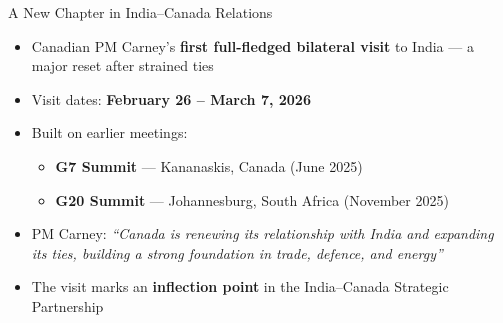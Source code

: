 \documentclass{beamer}
\begin{document}
\begin{frame}{A New Chapter in India--Canada Relations}
  \begin{itemize}
    \item Canadian PM Carney's \textbf{first full-fledged bilateral visit} to India --- a major reset after strained ties
    \item Visit dates: \textbf{February 26 -- March 7, 2026}
    \item Built on earlier meetings:
      \begin{itemize}
        \item \textbf{G7 Summit} --- Kananaskis, Canada (June 2025)
        \item \textbf{G20 Summit} --- Johannesburg, South Africa (November 2025)
      \end{itemize}
    \item PM Carney: \textit{``Canada is renewing its relationship with India and expanding its ties, building a strong foundation in trade, defence, and energy''}
    \item The visit marks an \textbf{inflection point} in the India--Canada Strategic Partnership
  \end{itemize}
\end{frame}
\end{document}
